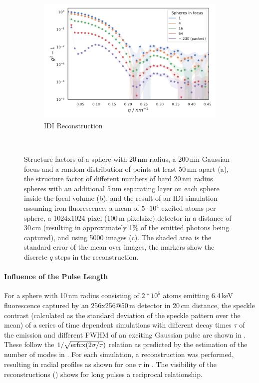 \begin{figure}
	\begin{subfigure}[b]{0.47\textwidth}
		\includegraphics[width=\linewidth]{images/multisphere2.pdf}
		\caption{IDI Reconstruction}
		\label{fig:multisphere2}
	\end{subfigure}
	\begin{subfigure}[b]{0.47\textwidth}
		$ $
	\end{subfigure}
	\caption[Structure factors and reconstructions for multiple spherical samples]{Structure factors of a sphere with 20\,nm radius, a 200\,nm Gaussian focus and a random distribution of points at least 50\,nm apart (a), the structure factor of different numbers of hard 20\,nm radius spheres with an additional 5\,nm separating layer on each sphere inside the focal volume (b), and the result of an IDI simulation assuming iron fluorescence, a mean of $5\cdot10^4$ excited atoms per sphere, a 1024x1024 pixel (100\,\textmu m pixelsize) detector in a distance of 30\,cm (resulting in approximately 1\% of the emitted photons being captured), and using 5000 images (c). The shaded area is the standard error of the mean over images, the markers show the discrete $q$ steps in the reconstruction.}
	
\end{figure}


\paragraph{Influence of the Pulse Length}
For a sphere with 10\,nm radius consisting of $2*10^5$ atoms emitting 6.4\,keV fluorescence captured by an 256x256@50\,\textmu m detector in 20\,cm distance, the speckle contrast (calculated as the standard deviation of the speckle pattern over the mean) of a series of time dependent simulations with different decay times $\tau$ of the emission and different FWHM of an exciting Gaussian pulse are shown in .  These follow the $1/\sqrt{\operatorname{erfcx}(2\sigma/\tau})$ relation as predicted by the estimation of the number of modes in .  For each simulation, a reconstruction was performed, resulting in radial profiles as shown for one $\tau$ in .  The visibility of the reconstructions () shows for long pulses a reciprocal relationship.

